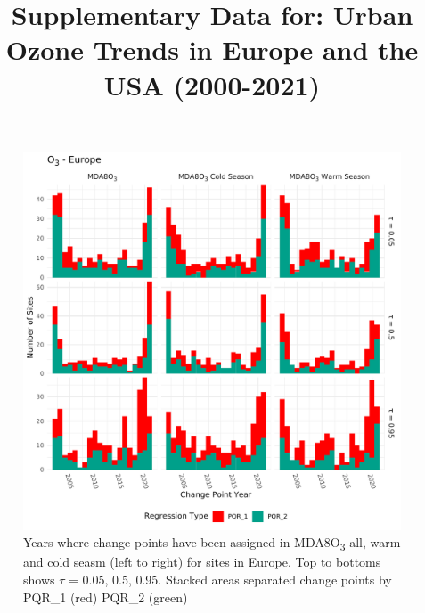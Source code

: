 \documentclass{article}
\title{Supplementary Data for: Urban Ozone Trends in Europe and the USA (2000-2021)}
\date{}
\begin{document}
\maketitle
\clearpage



\begin{figure}[p]
\centering
\includegraphics[width=\linewidth]{figures/si_figures/fS01_cp_year_o3_Europe.pdf}
\caption{Years where change points have been assigned in MDA8O\textsubscript{3} all, warm and cold seasm (left to right) for sites in Europe. Top to bottoms shows $\tau$ = 0.05, 0.5, 0.95. Stacked areas separated change points by PQR_1 (red) PQR_2 (green)}
\label{si_fig:cp_year_eu}
\end{figure}
\clearpage
\end{document}
